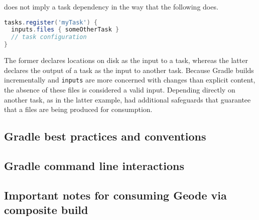 \documentclass[]{article}
\theoremstyle{definition}
\begin{document}
does not imply a task dependency in the way that the following does.
\begin{lstlisting}[language=Groovy]
tasks.register('myTask') {
  inputs.files { someOtherTask }
  // task configuration
}
\end{lstlisting}

The former declares locations on disk as the input to a task, whereas the latter declares the output of a task as the input to another task.
Because Gradle builds incrementally and \texttt{inputs} are more concerned with changes than explicit content, the absence of these files is considered a valid input.
Depending directly on another task, as in the latter example, had additional safeguards that guarantee that a files are being produced for consumption.

\subsection{Gradle best practices and conventions}

\subsection{Gradle command line interactions}

\subsection{Important notes for consuming Geode via composite build}
\end{document}

